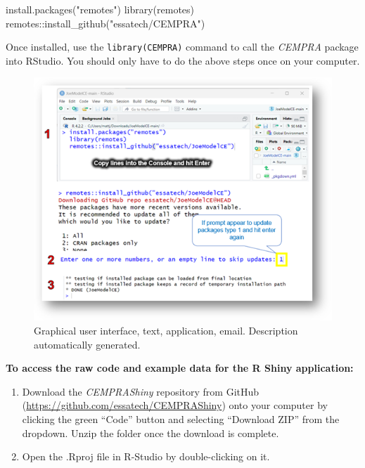 \documentclass[
  letterpaper,
  DIV=11,
  numbers=noendperiod]{scrreprt}
\newenvironment{Shaded}{\begin{snugshade}}{\end{snugshade}}
\newcommand{\FunctionTok}[1]{\textcolor[rgb]{0.28,0.35,0.67}{#1}}
\newcommand{\NormalTok}[1]{\textcolor[rgb]{0.00,0.23,0.31}{#1}}
\newcommand{\SpecialCharTok}[1]{\textcolor[rgb]{0.37,0.37,0.37}{#1}}
\newcommand{\StringTok}[1]{\textcolor[rgb]{0.13,0.47,0.30}{#1}}
\begin{document}
\begin{Shaded}
\begin{Highlighting}[]
\FunctionTok{install.packages}\NormalTok{(}\StringTok{"remotes"}\NormalTok{)}
\FunctionTok{library}\NormalTok{(remotes)}
\NormalTok{remotes}\SpecialCharTok{::}\FunctionTok{install\_github}\NormalTok{(}\StringTok{"essatech/CEMPRA"}\NormalTok{)}
\end{Highlighting}
\end{Shaded}

Once installed, use the \texttt{library(CEMPRA)} command to call the
\emph{CEMPRA} package into RStudio. You should only have to do the above
steps once on your computer.

\begin{figure}

{\centering \includegraphics{images/image015.png}

}

\caption{\label{fig-picture45}Graphical user interface, text,
application, email. Description automatically generated.}

\end{figure}

\textbf{To access the raw code and example data for the R Shiny
application:}

\begin{enumerate}
\def\labelenumi{\arabic{enumi}.}
\item
  Download the \emph{CEMPRAShiny} repository from GitHub
  (\url{https://github.com/essatech/CEMPRAShiny}) onto your computer by
  clicking the green ``Code'' button and selecting ``Download ZIP'' from
  the dropdown. Unzip the folder once the download is complete.
\item
  Open the .Rproj file in R-Studio by double-clicking on it.
\end{enumerate}
\end{document}
